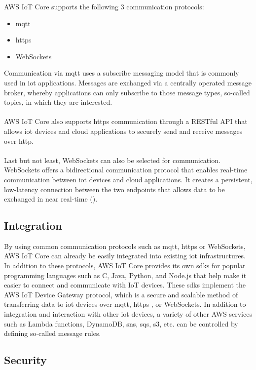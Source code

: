 AWS IoT Core supports the following 3 communication protocols:

\begin{itemize}
    \item \ac{mqtt}
    \item \ac{https}
    \item WebSockets
\end{itemize}

Communication via \ac{mqtt} uses a subscribe messaging model that is commonly used in \ac{iot} applications. 
Messages are exchanged via a centrally operated message broker, whereby applications can only subscribe to those message types, so-called topics, in which they are interested.
\\
\\
AWS IoT Core also supports \ac{https} communication through a RESTful API that allows \ac{iot} devices and cloud applications to securely send and receive messages over \ac{http}.
\\
\\
Last but not least, WebSockets can also be selected for communication. WebSockets offers a bidirectional communication protocol that enables real-time communication between \ac{iot} devices and cloud applications. 
It creates a persistent, low-latency connection between the two endpoints that allows data to be exchanged in near real-time ({\cite{ref02}}).

\subsection{Integration}

By using common communication protocols such as \ac{mqtt}, \ac{https} or WebSockets, AWS IoT Core can already be easily integrated into existing \ac{iot} infrastructures. 
In addition to these protocols, AWS IoT Core provides its own \ac{sdk}s for popular programming languages such as C, Java, Python, and Node.js that help make it easier to connect and communicate with IoT devices. 
These \ac{sdk}s implement the AWS IoT Device Gateway protocol, which is a secure and scalable method of transferring data to \ac{iot} devices over \ac{mqtt}, \ac{https} , or WebSockets.
In addition to integration and interaction with other \ac{iot} devices, a variety of other AWS services such as Lambda functions, DynamoDB, \ac{sns}, \ac{sqs}, \ac{s3}, etc. can be controlled by defining so-called message rules.

\subsection{Security}